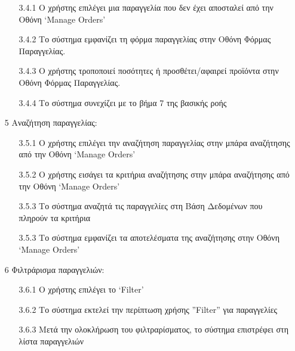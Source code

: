 \documentclass[12pt,a4paper,twoside]{book}
\begin{document}
\begin{enumerate}
        \begin{enumerate}
          \item[3.4.1 ] Ο χρήστης επιλέγει μια παραγγελία που δεν έχει αποσταλεί από την Οθόνη `Manage Orders' %
          \item[3.4.2 ] Το σύστημα εμφανίζει τη φόρμα παραγγελίας στην Οθόνη Φόρμας Παραγγελίας.
          \item[3.4.3 ] Ο χρήστης τροποποιεί ποσότητες ή προσθέτει/αφαιρεί προϊόντα στην Οθόνη Φόρμας Παραγγελίας.
          \item[3.4.4 ] Το σύστημα συνεχίζει με το βήμα 7 της βασικής ροής %
        \end{enumerate}
  \item[5 ] Αναζήτηση παραγγελίας:
        \begin{enumerate}
          \item[3.5.1 ] Ο χρήστης επιλέγει την αναζήτηση παραγγελίας στην μπάρα αναζήτησης από την Οθόνη `Manage Orders' %
          \item[3.5.2 ] Ο χρήστης εισάγει τα κριτήρια αναζήτησης στην μπάρα αναζήτησης από την Οθόνη `Manage Orders' %
          \item[3.5.3 ] Το σύστημα αναζητά τις παραγγελίες στη Βάση Δεδομένων που πληρούν τα κριτήρια %
          \item[3.5.3 ] Το σύστημα εμφανίζει τα αποτελέσματα της αναζήτησης στην Οθόνη `Manage Orders' %
        \end{enumerate}
  \item[6 ] Φιλτράρισμα παραγγελιών:
        \begin{enumerate}
          \item[3.6.1 ] Ο χρήστης επιλέγει το `Filter' %
          \item[3.6.2 ] Το σύστημα εκτελεί την περίπτωση χρήσης ”Filter” για παραγγελίες
          \item[3.6.3 ] Μετά την ολοκλήρωση του φιλτραρίσματος, το σύστημα επιστρέφει στη λίστα παραγγελιών
        \end{enumerate}
\end{enumerate}
\end{document}
